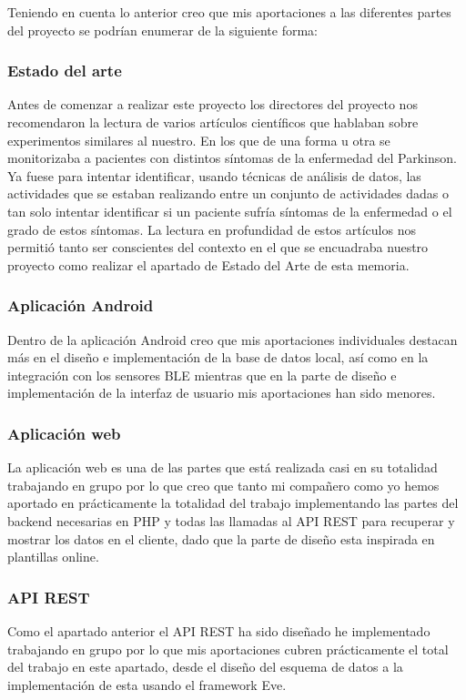 \documentclass[11pt,spanish]{article}
\begin{document}
Teniendo en cuenta lo anterior creo que mis aportaciones a las diferentes partes del proyecto se podrían enumerar de la siguiente forma:

\subsubsection{Estado del arte}
Antes de comenzar a realizar este proyecto los directores del proyecto nos recomendaron la lectura de varios artículos científicos que hablaban sobre experimentos similares al nuestro. En los que de una forma u otra se monitorizaba a pacientes con distintos síntomas de la enfermedad del Parkinson. Ya fuese para intentar identificar, usando técnicas de análisis de datos, las actividades que se estaban realizando entre un conjunto de actividades dadas o tan solo intentar identificar si un paciente sufría síntomas de la enfermedad o el grado de estos síntomas. La lectura en profundidad de estos artículos nos permitió tanto ser conscientes del contexto en el que se encuadraba nuestro proyecto como realizar el apartado de Estado del Arte de esta memoria. 

\subsubsection{Aplicación Android}

Dentro de la aplicación Android creo que mis aportaciones individuales destacan más en el diseño e implementación de la base de datos local, así como en la integración con los sensores BLE mientras que en la parte de diseño e implementación de la interfaz de usuario mis aportaciones han sido menores.

\subsubsection{Aplicación web}
La aplicación web es una de las partes que está realizada casi en su totalidad trabajando en grupo por lo que creo que tanto mi compañero como yo hemos aportado en prácticamente la totalidad del trabajo implementando las partes del backend necesarias en PHP y todas las llamadas al API REST para recuperar y mostrar los datos en el cliente, dado que la parte de diseño esta inspirada en plantillas online.

\subsubsection{API REST}
Como el apartado anterior el API REST ha sido diseñado he implementado trabajando en grupo por lo que mis aportaciones cubren prácticamente el total del trabajo en este apartado, desde el diseño del esquema de datos a la implementación de esta usando el framework Eve.
\end{document}
